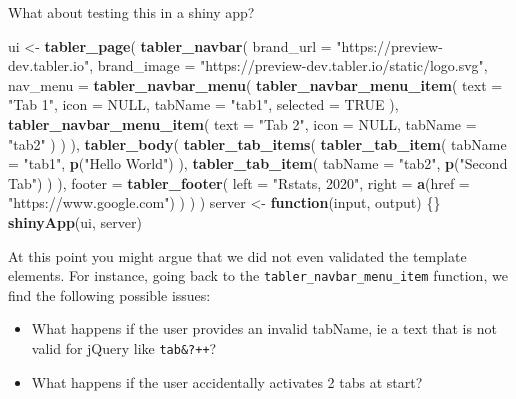 \documentclass[
]{book}
\newenvironment{Shaded}{\begin{snugshade}}{\end{snugshade}}
\newcommand{\ControlFlowTok}[1]{\textcolor[rgb]{0.13,0.29,0.53}{\textbf{#1}}}
\newcommand{\DataTypeTok}[1]{\textcolor[rgb]{0.13,0.29,0.53}{#1}}
\newcommand{\KeywordTok}[1]{\textcolor[rgb]{0.13,0.29,0.53}{\textbf{#1}}}
\newcommand{\NormalTok}[1]{#1}
\newcommand{\OtherTok}[1]{\textcolor[rgb]{0.56,0.35,0.01}{#1}}
\newcommand{\StringTok}[1]{\textcolor[rgb]{0.31,0.60,0.02}{#1}}
\providecommand{\tightlist}{%
  \setlength{\itemsep}{0pt}\setlength{\parskip}{0pt}}
\begin{document}
What about testing this in a shiny app?

\begin{Shaded}
\begin{Highlighting}[]
\NormalTok{ui <-}\StringTok{ }\KeywordTok{tabler_page}\NormalTok{(}
  \KeywordTok{tabler_navbar}\NormalTok{(}
    \DataTypeTok{brand_url =} \StringTok{"https://preview-dev.tabler.io"}\NormalTok{, }
    \DataTypeTok{brand_image =} \StringTok{"https://preview-dev.tabler.io/static/logo.svg"}\NormalTok{, }
    \DataTypeTok{nav_menu =} \KeywordTok{tabler_navbar_menu}\NormalTok{(}
      \KeywordTok{tabler_navbar_menu_item}\NormalTok{(}
        \DataTypeTok{text =} \StringTok{"Tab 1"}\NormalTok{,}
        \DataTypeTok{icon =} \OtherTok{NULL}\NormalTok{,}
        \DataTypeTok{tabName =} \StringTok{"tab1"}\NormalTok{,}
        \DataTypeTok{selected =} \OtherTok{TRUE}
\NormalTok{      ),}
      \KeywordTok{tabler_navbar_menu_item}\NormalTok{(}
        \DataTypeTok{text =} \StringTok{"Tab 2"}\NormalTok{,}
        \DataTypeTok{icon =} \OtherTok{NULL}\NormalTok{,}
        \DataTypeTok{tabName =} \StringTok{"tab2"}
\NormalTok{      )}
\NormalTok{    )}
\NormalTok{  ),}
  \KeywordTok{tabler_body}\NormalTok{(}
    \KeywordTok{tabler_tab_items}\NormalTok{(}
      \KeywordTok{tabler_tab_item}\NormalTok{(}
        \DataTypeTok{tabName =} \StringTok{"tab1"}\NormalTok{,}
        \KeywordTok{p}\NormalTok{(}\StringTok{"Hello World"}\NormalTok{)}
\NormalTok{      ),}
      \KeywordTok{tabler_tab_item}\NormalTok{(}
        \DataTypeTok{tabName =} \StringTok{"tab2"}\NormalTok{,}
        \KeywordTok{p}\NormalTok{(}\StringTok{"Second Tab"}\NormalTok{)}
\NormalTok{      )}
\NormalTok{    ),}
    \DataTypeTok{footer =} \KeywordTok{tabler_footer}\NormalTok{(}
      \DataTypeTok{left =} \StringTok{"Rstats, 2020"}\NormalTok{, }
      \DataTypeTok{right =} \KeywordTok{a}\NormalTok{(}\DataTypeTok{href =} \StringTok{"https://www.google.com"}\NormalTok{)}
\NormalTok{    )}
\NormalTok{  )}
\NormalTok{)}
\NormalTok{server <-}\StringTok{ }\ControlFlowTok{function}\NormalTok{(input, output) \{\}}
\KeywordTok{shinyApp}\NormalTok{(ui, server)}
\end{Highlighting}
\end{Shaded}

At this point you might argue that we did not even validated the template elements. For instance, going back to the \texttt{tabler\_navbar\_menu\_item} function, we find the following possible issues:

\begin{itemize}
\tightlist
\item
  What happens if the user provides an invalid tabName, ie a text that is not valid for jQuery like \texttt{tab\&?++}?
\item
  What happens if the user accidentally activates 2 tabs at start?
\end{itemize}
\end{document}
